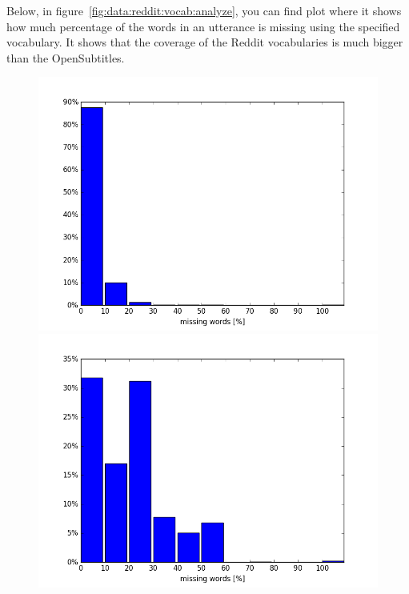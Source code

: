 Below, in figure~\ref{fig:data:reddit:vocab:analyze}, you can find plot where it shows how much percentage of the words in an utterance is missing using the specified vocabulary. It shows that the coverage of the Reddit vocabularies is much bigger than the OpenSubtitles.

\begin{figure}[H]
	\includegraphics[width=\linewidth]{img/reddit_vocab_analyze_100k_perc.PNG}
	\centering
	\small
	\endminipage\hfill
	\includegraphics[width=\linewidth]{img/opus_vocab_analyze_100k_perc.PNG}
	\centering
	\small

\end{figure}
